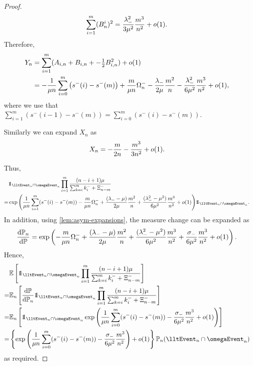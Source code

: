 \begin{proof}
\begin{equation*}
        \sum_{i=1}^m (B_n^i)^2 = \frac{\lambda_-^2}{3 \mu^2} \frac{m^3}{n^2} + o(1).
    \end{equation*}
    Therefore,
    \begin{align*}
        Y_n
        &= \sum_{i=1}^m (A_{i, n} + B_{i, n} + - \tfrac{1}{2} B_{i, n}^2) + o(1) \\
        &= - \frac{1}{\mu n} \sum_{i=0}^m \left( s^-(i) - s^-(m) \right)
        + \frac{m}{\mu n} \Omega_n^-
        - \frac{\lambda_-}{2\mu} \frac{m^2}{n} - \frac{\lambda_-^2}{6 \mu^2} \frac{m^3}{n^2} + o(1),
    \end{align*}
    where we use that $\sum_{i=1}^m \left( s^-(i-1) - s^-(m) \right) = \sum_{i=0}^m \left( s^-(i) - s^-(m) \right)$.

    Similarly we can expand $X_n$ as
    \begin{equation*}
        X_n = - \frac{m}{2 n} - \frac{m^3}{3 n^2} + o(1).
    \end{equation*}

    Thus,
    \begin{align*}
        &\one_{\lltEvent_n \cap \omegaEvent_n} \prod_{i=1}^m \frac{(n-i+1)\mu}{\sum_{k=i}^m k^-_i + \Xi^-_{n-m}} \\
        = &\exp \Bigg( \frac{1}{\mu n} \sum_{i=1}^m (s^-(i) - s^-(m)) \nonumber
         - \frac{m}{\mu n} \Omega^-_n + \frac{(\lambda_- - \mu)}{2 \mu} \frac{m^2}{n} + \frac{(\lambda_-^2 - \mu^2)}{6 \mu^2} \frac{m^3}{n^2} + \littleo(1) \Bigg) \one_{\lltEvent_n \cap \omegaEvent_n}.
    \end{align*}
    In addition, using \cref{lem:asym-expansions}, the measure change can be expanded as
    \begin{equation*}
        \frac{\mathrm{d}{\mathbb P}_n}{\mathrm{d}{\mathbb P}} = \exp \left( 
            - \frac{m}{\mu n} \Omega_n^- + \frac{(\lambda_- - \mu)}{2\mu} \frac{m^2}{n}
            + \frac{(\lambda_-^2 - \mu^2)}{6 \mu^2} \frac{m^3}{n^2} + \frac{\sigma_-}{6 \mu^2} \frac{m^3}{n^2} + o(1)
        \right).
    \end{equation*}
    Hence,
    \begin{align*}
        &\E\left[ 
            \one_{\lltEvent_n \cap \omegaEvent_n}
            \prod_{i=1}^m \frac{(n-i+1)\mu}{\sum_{k=i}^m k^-_i + \Xi^-_{n-m}}
        \right] \\
        =& \E_n\left[ 
            \frac{\dif \P}{\dif \P_n}
            \one_{\lltEvent_n \cap \omegaEvent_n}
            \prod_{i=1}^m \frac{(n-i+1)\mu}{\sum_{k=i}^m k^-_i + \Xi^-_{n-m}}
        \right] \\
        =& \E_n \left[ 
            \one_{\lltEvent_n \cap \omegaEvent_n}
            \exp \left( 
                \frac{1}{\mu n} \sum_{i=0}^m (s^-(i) - s^-(m)) - \frac{\sigma_-}{6 \mu^2} \frac{m^3}{n^2} + \littleo(1)
            \right)
        \right] \\
        =& \left\{  
            \exp \left( 
                \frac{1}{\mu n} \sum_{i=0}^m (s^-(i) - s^-(m)) - \frac{\sigma_-}{6 \mu^2} \frac{m^3}{n^2}
            \right) + \littleo(1)
         \right\} \P_n(\lltEvent_n \cap \omegaEvent_n)
    \end{align*}
    as required.
\end{proof}

